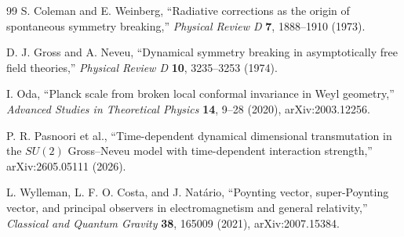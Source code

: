 \documentclass[11pt,a4paper]{article}
\begin{document}
\begin{thebibliography}{99}
S. Coleman and E. Weinberg,
``Radiative corrections as the origin of spontaneous symmetry breaking,''
\emph{Physical Review D} \textbf{7}, 1888--1910 (1973).

D. J. Gross and A. Neveu,
``Dynamical symmetry breaking in asymptotically free field theories,''
\emph{Physical Review D} \textbf{10}, 3235--3253 (1974).

I. Oda,
``Planck scale from broken local conformal invariance in Weyl geometry,''
\emph{Advanced Studies in Theoretical Physics} \textbf{14}, 9--28 (2020), arXiv:2003.12256.

P. R. Pasnoori et al.,
``Time-dependent dynamical dimensional transmutation in the $SU(2)$ Gross--Neveu model with time-dependent interaction strength,'' arXiv:2605.05111 (2026).

L. Wylleman, L. F. O. Costa, and J. Nat\'ario,
``Poynting vector, super-Poynting vector, and principal observers in electromagnetism and general relativity,''
\emph{Classical and Quantum Gravity} \textbf{38}, 165009 (2021), arXiv:2007.15384.

\end{thebibliography}
\end{document}
